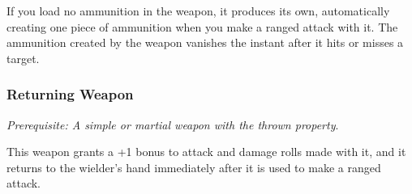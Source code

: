         If you load no ammunition in the weapon, it produces its own, automatically creating one piece of ammunition when you make a ranged attack with it.
        The ammunition created by the weapon vanishes the instant after it hits or misses a target.
    \subsubsection{Returning Weapon}
        \textit{Prerequisite: A simple or martial weapon with the thrown property}.

        This weapon grants a +1 bonus to attack and damage rolls made with it, and it returns to the wielder's hand immediately after it is used to make a ranged attack.
